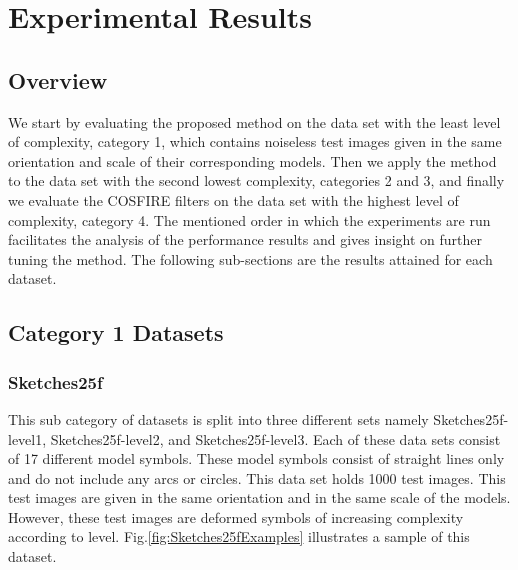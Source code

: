 \chapter{Experimental Results}
\section {Overview}
We start by evaluating the proposed method on the data set with the least level of complexity, category 1, which contains noiseless test images given in the same orientation and scale of their corresponding models. Then we apply the method to the data set with the second lowest complexity, categories 2 and 3, and finally we evaluate the COSFIRE filters on the data set with the highest level of complexity, category 4. The mentioned order in which  the experiments are run facilitates the analysis of the performance results and gives insight on further tuning the method. The following sub-sections are the results attained for each dataset.\\

\section {Category 1 Datasets}
\subsection{Sketches25f}
This sub category of datasets is split into three different sets namely Sketches25f-level1, Sketches25f-level2, and Sketches25f-level3. Each of these data sets consist of 17 different model symbols. These model symbols consist of straight lines only and do not include any arcs or circles. This data set holds 1000 test images. This test images are given in the same orientation and in the same scale of the models. However, these test images are deformed symbols of increasing complexity according to level. Fig.\ref{fig:Sketches25fExamples} illustrates a sample of this dataset.
    
